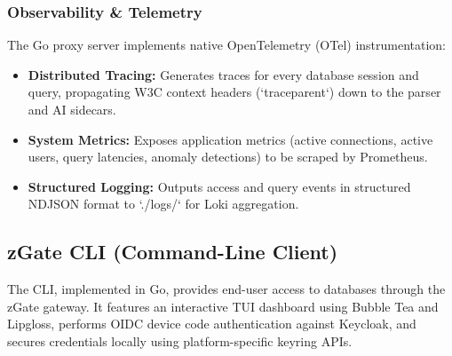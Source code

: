 \subsubsection{Observability \& Telemetry}

The Go proxy server implements native OpenTelemetry (OTel) instrumentation:
\begin{itemize}
    \item \textbf{Distributed Tracing:} Generates traces for every database session and query, propagating W3C context headers (`traceparent`) down to the parser and AI sidecars.
    \item \textbf{System Metrics:} Exposes application metrics (active connections, active users, query latencies, anomaly detections) to be scraped by Prometheus.
    \item \textbf{Structured Logging:} Outputs access and query events in structured NDJSON format to `./logs/` for Loki aggregation.
\end{itemize}


\subsection{zGate CLI (Command-Line Client)}

The CLI, implemented in Go, provides end-user access to databases through the zGate gateway. It features an interactive TUI dashboard using Bubble Tea and Lipgloss, performs OIDC device code authentication against Keycloak, and secures credentials locally using platform-specific keyring APIs.

